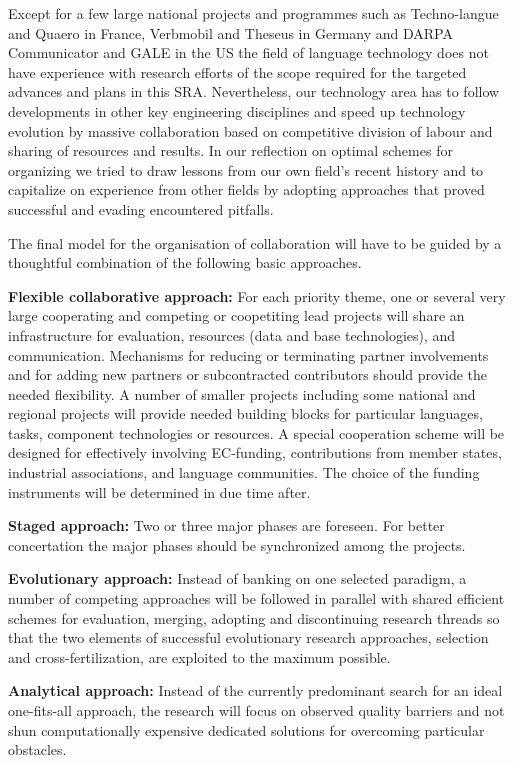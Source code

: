 \documentclass[10pt, plain]{../../metanetpaper}
\begin{document}
\begin{multicols}{2}
Except for a few large national projects and programmes such as Techno-langue and Quaero in France, Verbmobil and Theseus in Germany and DARPA Communicator and GALE in the US the field of language technology does not have experience with research efforts of the scope required for the targeted advances and plans in this SRA.  Nevertheless, our technology area has to follow developments in other key engineering disciplines and speed up technology evolution by massive collaboration based on competitive division of labour and sharing of resources and results. In our reflection on optimal schemes for organizing we tried to draw lessons from our own field’s recent history and to capitalize on experience from other fields by adopting approaches that proved successful and evading encountered pitfalls.
 
The final model for the organisation of collaboration will have to be guided by a thoughtful combination of the following basic approaches.
 
\textbf{Flexible collaborative approach:}  For each priority theme, one or several very large cooperating and competing or coopetiting lead projects will share an infrastructure for evaluation, resources (data and base technologies), and communication. Mechanisms for reducing or terminating partner involvements and for adding new partners or subcontracted contributors should provide the needed flexibility. A number of smaller projects including some national and regional projects will provide needed building blocks for particular languages, tasks, component technologies or resources. A special cooperation scheme will be designed for effectively involving EC-funding, contributions from member states, industrial associations, and language communities. The choice of the funding instruments will be determined in due time after.

\textbf{Staged approach:} Two or three major phases are foreseen. For better concertation the major phases should be synchronized among the projects.   

\textbf{Evolutionary approach:} Instead of banking on one selected paradigm, a number of competing approaches will be followed in parallel with shared efficient schemes for evaluation, merging, adopting and discontinuing research threads so that the two elements of successful evolutionary research approaches, selection and cross-fertilization, are exploited to the maximum possible.

\textbf{Analytical approach:} Instead of the currently predominant search for an ideal one-fits-all approach, the research will focus on observed quality barriers and not shun computationally expensive dedicated solutions for overcoming particular obstacles.


\end{multicols}
\end{document}
